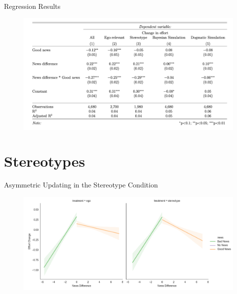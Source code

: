 \documentclass[aspectratio=169]{beamer}
\begin{document}
\begin{frame}{Regression Results}
    \begin{figure}
        \centering
        \includegraphics[scale=.4]{regression_table.png}
    \end{figure}  
\end{frame}

\section*{Stereotypes}

\begin{frame}{Asymmetric Updating in the Stereotype Condition}

    \begin{figure}
        \centering
        \includegraphics[scale=.5]{effort_change_news_treatment.png}
    \end{figure}
    
\end{frame}
\end{document}
